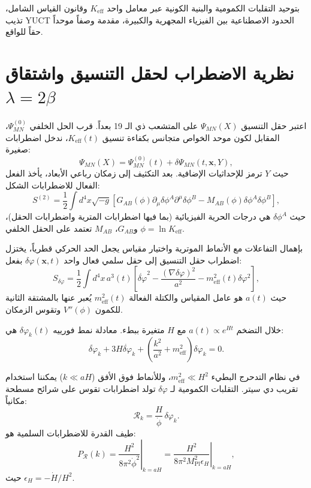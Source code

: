 \documentclass[12pt,a4paper]{article}
\newcommand{\Keff}{K_{\mathrm{eff}}}
\newcommand{\Mpl}{M_{\mathrm{Pl}}}
\begin{document}
	بتوحيد التقلبات الكمومية والبنية الكونية عبر معامل واحد \(K_{\mathrm{eff}}\) وقانون القياس الشامل، تذيب YUCT الحدود الاصطناعية بين الفيزياء المجهرية والكبيرة، مقدمة وصفاً موحداً حقاً للواقع.
	
	\appendix
	\section{نظرية الاضطراب لحقل التنسيق واشتقاق \(\lambda = 2\beta\)}
	\label{app:perturbations}
	
	اعتبر حقل التنسيق \(\Psi_{MN}(X)\) على المتشعب ذي الـ 19 بعداً. قرب الحل الخلفي \(\Psi^{(0)}_{MN}\)، المقابل لكون موحد الخواص متجانس بكفاءة تنسيق \(\Keff(t)\)، ندخل اضطرابات صغيرة:
	\begin{equation}
		\Psi_{MN}(X) = \Psi^{(0)}_{MN}(t) + \delta\Psi_{MN}(t,\mathbf{x},Y),
	\end{equation}
	حيث \(Y\) ترمز للإحداثيات الإضافية. بعد التكثيف إلى زمكان رباعي الأبعاد، يأخذ الفعل الفعال للاضطرابات الشكل:
	\begin{equation}
		S^{(2)} = \frac{1}{2} \int d^4x \sqrt{-g} \left[ G_{AB}(\phi) \partial_\mu \delta\phi^A \partial^\mu \delta\phi^B - M_{AB}(\phi) \delta\phi^A \delta\phi^B \right],
	\end{equation}
	حيث \(\delta\phi^A\) هي درجات الحرية الفيزيائية (بما فيها اضطرابات المترية واضطرابات الحقل)، و\(G_{AB}\)، \(M_{AB}\) تعتمد على الحقل الخلفي \(\phi = \ln\Keff\).
	
	بإهمال التفاعلات مع الأنماط الموترية واختيار مقياس يجعل الحد الحركي قطرياً، يختزل اضطراب حقل التنسيق إلى حقل سلمي فعال واحد \(\delta\varphi(\mathbf{x},t)\) بفعل:
	\begin{equation}
		S_{\delta\varphi} = \frac{1}{2} \int d^4x \, a^3(t) \left[ \dot{\delta\varphi}^2 - \frac{(\nabla\delta\varphi)^2}{a^2} - m_{\mathrm{eff}}^2(t) \delta\varphi^2 \right],
	\end{equation}
	حيث \(a(t)\) هو عامل المقياس والكتلة الفعالة \(m_{\mathrm{eff}}^2(t)\) يُعبر عنها بالمشتقة الثانية للكمون \(V''(\phi)\) وتقوس الزمكان.
	
	خلال التضخم \(a(t) \propto e^{Ht}\) مع \(H\) متغيرة ببطء. معادلة نمط فورييه \(\delta\varphi_k(t)\) هي:
	\begin{equation}
		\ddot{\delta\varphi}_k + 3H\dot{\delta\varphi}_k + \left( \frac{k^2}{a^2} + m_{\mathrm{eff}}^2 \right) \delta\varphi_k = 0.
	\end{equation}
	
	في نظام التدحرج البطيء \(m_{\mathrm{eff}}^2 \ll H^2\)، وللأنماط فوق الأفق (\(k \ll aH\)) يمكننا استخدام تقريب دي سيتر. التقلبات الكمومية لـ \(\delta\varphi\) تولد اضطرابات تقوس على شرائح مسطحة مكانياً:
	\begin{equation}
		\mathcal{R}_k = \frac{H}{\dot{\phi}} \, \delta\varphi_k.
	\end{equation}
	طيف القدرة للاضطرابات السلمية هو:
	\begin{equation}
		P_{\mathcal{R}}(k) = \left. \frac{H^2}{8\pi^2 \dot{\phi}^2} \right|_{k=aH} = \left. \frac{H^2}{8\pi^2 \Mpl^2 \epsilon_H} \right|_{k=aH},
	\end{equation}
	حيث \(\epsilon_H = -\dot{H}/H^2\).
	
\end{document}
